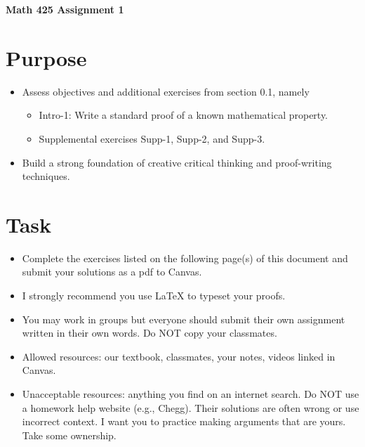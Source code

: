 \documentclass[12pt]{article}
\begin{document}
	\begin{center}
		{\Large \bf Math 425 Assignment 1}
	\end{center}
	\section*{Purpose}
		\begin{itemize}
			\item Assess objectives and additional exercises from section 0.1, namely
				\begin{itemize}
					\item Intro-1: Write a standard proof of a known mathematical property.
					\item Supplemental exercises Supp-1, Supp-2, and Supp-3. 
				\end{itemize}
			\item Build a strong foundation of creative critical thinking and proof-writing techniques.
		\end{itemize}
	\section*{Task}
		\begin{itemize}
			\item Complete the exercises listed on the following page(s) of this document and submit your solutions as a pdf to Canvas.
			\item I strongly recommend you use LaTeX to typeset your proofs.
			\item You may work in groups but everyone should submit their own assignment written in their own words.  Do NOT copy your classmates.
			\item Allowed resources: our textbook, classmates, your notes, videos linked in Canvas.
			\item Unacceptable resources: anything you find on an internet search. Do NOT use a homework help website (e.g., Chegg). Their solutions are often wrong or use incorrect context.  I want you to practice making arguments that are yours. Take some ownership.
		\end{itemize}
\end{document}
